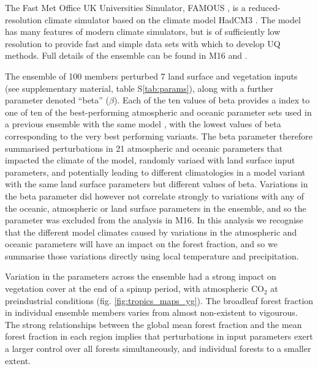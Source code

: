 \documentclass[gmd, manuscript]{copernicus}
\begin{document}
The Fast Met Office UK Universities Simulator, FAMOUS \citep{jones2005systematic, smith2008famous}, is a reduced-resolution climate simulator based on the climate model HadCM3 \citep{gordon2000simulation, pope2000impact}. The model has many features of modern climate simulators, but is of sufficiently low resolution to provide fast and simple data sets with which to develop UQ methods. Full details of the ensemble can be found in M16 and \cite{williams2013optimising}.

The ensemble of 100 members perturbed 7 land surface and vegetation inputs (see supplementary material, table S\ref{tab:params}), along with a further parameter denoted ``beta'' ($\beta$). Each of the ten values of beta provides a index to one of ten of the best-performing atmospheric and oceanic parameter sets used in a previous ensemble with the same model \cite{gregoire2010optimal}, with the lowest values of beta corresponding to the very best performing variants. The beta parameter therefore summarised perturbations in 21 atmospheric and oceanic parameters that impacted the climate of the model, randomly variaed with land surface input parameters, and potentially leading to different climatologies in a model variant with the same land surface parameters but different values of beta. Variations in the beta parameter did however not correlate strongly to variations with any of the oceanic, atmospheric or land surface parameters in the ensemble, and so the parameter was excluded from the analysis in M16. In this analysis we recognise that the different model climates caused by variations in the atmospheric and oceanic parameters will have an impact on the forest fraction, and so we summarise those variations directly using local temperature and precipitation.

Variation in the parameters across the ensemble had a strong impact on vegetation cover at the end of a spinup period, with atmospheric CO$_2$ at preindustrial conditions (fig. \ref{fig:tropics_maps_yg}). The broadleaf forest fraction in individual ensemble members varies from almost non-existent to vigourous. The strong relationships between the global mean forest fraction and the mean forest fraction in each region implies that perturbations in input parameters exert a larger control over all forests simultaneously, and individual forests to a smaller extent.
\end{document}
